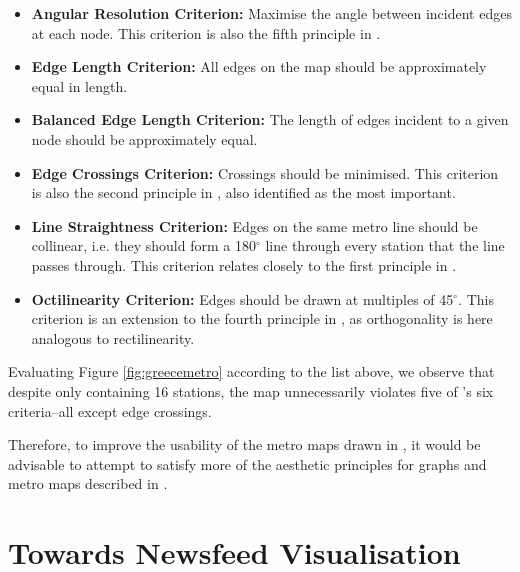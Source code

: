 \begin{itemize}
	\item \textbf{Angular Resolution Criterion:} Maximise the angle between incident edges at each node. This criterion is also the fifth principle in \citep{TheBasisForGraphDrawingAlgorithms}. 
	\item \textbf{Edge Length Criterion:} All edges on the map should be approximately equal in length.
	\item \textbf{Balanced Edge Length Criterion:} The length of edges incident to a given node should be approximately equal.
	\item \textbf{Edge Crossings Criterion:} Crossings should be minimised. This criterion is also the second principle in \citep{TheBasisForGraphDrawingAlgorithms}, also identified as the most important.
	\item \textbf{Line Straightness Criterion:} Edges on the same metro line should be collinear, i.e. they should form a 180$^{\circ}$ line through every station that the line passes through. This criterion relates closely to the first principle in \citep{TheBasisForGraphDrawingAlgorithms}.
	\item \textbf{Octilinearity Criterion:} Edges should be drawn at multiples of 45$^{\circ}$. This criterion is an extension to the fourth principle in \citep{TheBasisForGraphDrawingAlgorithms}, as orthogonality is here analogous to rectilinearity.
\end{itemize}

Evaluating Figure \ref{fig:greecemetro} according to the list above, we observe that despite only containing 16 stations, the map unnecessarily violates five  of \citeauthor{AutomaticMetroMapLayout}'s six criteria--all except edge crossings.

Therefore, to improve the usability of the metro maps drawn in \citep{ConnectingTheDots, GeneratingInformationMaps, MetroMapsOfScience, InformationCartographyPre}, it would be advisable to attempt to satisfy more of the aesthetic principles for graphs and metro maps described in \citep{TheBasisForGraphDrawingAlgorithms, AutomaticMetroMapLayout}.


\section{Towards Newsfeed Visualisation}

